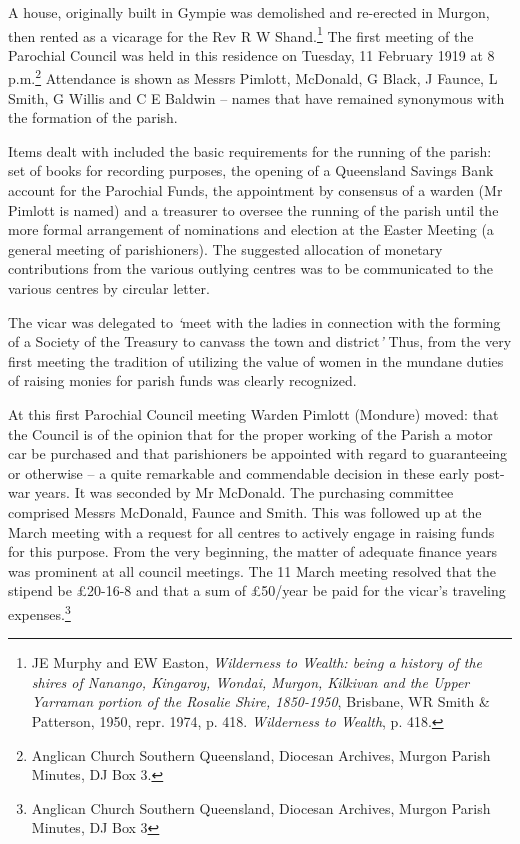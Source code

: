A house, originally built in Gympie was demolished and re-erected in Murgon, then rented as a vicarage for the Rev R W Shand.\footnote{JE Murphy and EW Easton, \emph{Wilderness to Wealth: being a history of the shires of Nanango, Kingaroy, Wondai, Murgon, Kilkivan and the Upper Yarraman portion of the Rosalie Shire, 1850-1950}, Brisbane, WR Smith \& Patterson, 1950, repr. 1974, p. 418. \emph{Wilderness to Wealth}, p. 418.} The first meeting of the Parochial Council was held in this residence on Tuesday, 11 February 1919 at 8 p.m.\footnote{Anglican Church Southern Queensland, Diocesan Archives, Murgon Parish Minutes, DJ Box 3.} Attendance is shown as Messrs Pimlott, McDonald, G Black, J Faunce, L Smith, G Willis and C E Baldwin -- names that have remained synonymous with the formation of the parish.

Items dealt with included the basic requirements for the running of the parish: set of books for recording purposes, the opening of a Queensland Savings Bank account for the Parochial Funds, the appointment by consensus of a warden (Mr Pimlott is named) and a treasurer to oversee the running of the parish until the more formal arrangement of nominations and election at the Easter Meeting (a general meeting of parishioners). The suggested allocation of monetary contributions from the various outlying centres was to be communicated to the various centres by circular letter.

The vicar was delegated to \emph{`}meet with the ladies in connection with the forming of a Society of the Treasury to canvass the town and district\emph{'} Thus, from the very first meeting the tradition of utilizing the value of women in the mundane duties of raising monies for parish funds was clearly recognized.

At this first Parochial Council meeting Warden Pimlott (Mondure) moved: that the Council is of the opinion that for the proper working of the Parish a motor car be purchased and that parishioners be appointed with regard to guaranteeing or otherwise -- a quite remarkable and commendable decision in these early post-war years. It was seconded by Mr McDonald. The purchasing committee comprised Messrs McDonald, Faunce and Smith. This was followed up at the March meeting with a request for all centres to actively engage in raising funds for this purpose. From the very beginning, the matter of adequate finance years was prominent at all council meetings. The 11 March meeting resolved that the stipend be £20-16-8 and that a sum of £50/year be paid for the vicar's traveling expenses.\footnote{Anglican Church Southern Queensland, Diocesan Archives, Murgon Parish Minutes, DJ Box 3}

